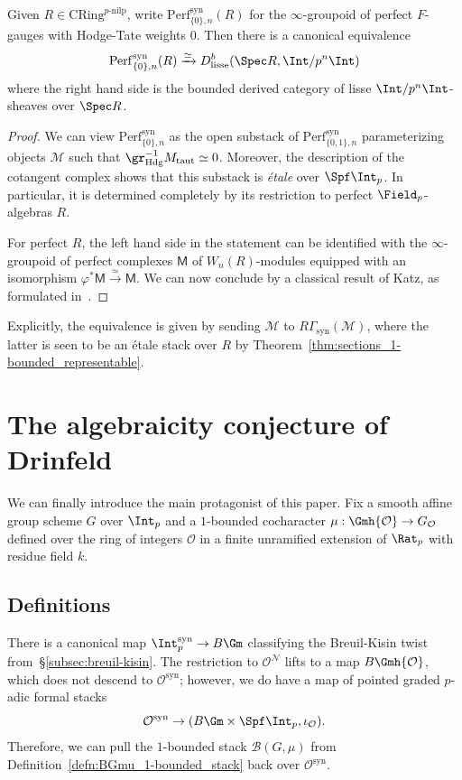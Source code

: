 \documentclass[10pt]{amsart}
\begin{document}
\begin{corollary}
\label{cor:HT_wts_0}
Given $R\in \mathrm{CRing}^{p\text{-nilp}}$, write $\mathrm{Perf}^{\mathrm{syn}}_{\{0\},n}(R)$ for the $\infty$-groupoid of perfect $F$-gauges with Hodge-Tate weights $0$. Then there is a canonical equivalence
\[
\mathrm{Perf}^{\mathrm{syn}}_{\{0\},n}(R)\xrightarrow{\simeq}D^b_{\mathrm{lisse}}(\Spec R,\Int/p^n\Int)
\]
where the right hand side is the bounded derived category of lisse $\Int/p^n\Int$-sheaves over $\Spec R$.
\end{corollary}
\begin{proof}
We can view $\mathrm{Perf}^{\mathrm{syn}}_{\{0\},n}$ as the open substack of $\mathrm{Perf}^{\mathrm{syn}}_{\{0,1\},n}$ parameterizing objects $\mathcal{M}$ such that $\gr^{-1}_{\mathrm{Hdg}}M_{\mathrm{taut}} \simeq 0$. Moreover, the description of the cotangent complex shows that this substack is \emph{\'etale} over $\Spf\Int_p$. In particular, it is determined completely by its restriction to perfect $\Field_p$-algebras $R$. 

For perfect $R$, the left hand side in the statement can be identified with the $\infty$-groupoid of perfect complexes $\mathsf{M}$ of $W_n(R)$-modules equipped with an isomorphism $\varphi^*\mathsf{M}\xrightarrow{\simeq}\mathsf{M}$. We can now conclude by a classical result of Katz, as formulated in~\cite[Proposition 3.6]{MR4600546}.
\end{proof} 

\begin{remark}
Explicitly, the equivalence is given by sending $\mathcal{M}$ to $R\Gamma_{\mathrm{syn}}(\mathcal{M})$, where the latter is seen to be an \'etale stack over $R$ by Theorem~\ref{thm:sections_1-bounded_representable}.
\end{remark}


\section{The algebraicity conjecture of Drinfeld}
\label{sec:main}

We can finally introduce the main protagonist of this paper. Fix a smooth affine group scheme $G$ over $\Int_p$ and a $1$-bounded cocharacter $\mu:\Gmh{\mathcal{O}}\to G_{\mathcal{O}}$ defined over the ring of integers $\mathcal{O}$ in a finite unramified extension of $\Rat_p$ with residue field $k$.


\subsection{Definitions}
\label{subsec:defns}
There is a canonical map $\Int_p^{\mathrm{syn}}\to B\Gm$ classifying the Breuil-Kisin twist from~\S\ref{subsec:breuil-kisin}. The restriction to $\mathcal{O}^{\mathcal{N}}$ lifts to a map $B\Gmh{\mathcal{O}}$, which does not descend to $\mathcal{O}^{\mathrm{syn}}$; however, we do have a map of pointed graded $p$-adic formal stacks
\[
\mathcal{O}^{\mathrm{syn}}\to (B\Gm\times\Spf\Int_p,\iota_{\mathcal{O}}).
\]
Therefore, we can pull the $1$-bounded stack $\mathcal{B}(G,\mu)$ from Definition~\eqref{defn:BGmu_1-bounded_stack} back over $\mathcal{O}^{\mathrm{syn}}$.
\end{document}
